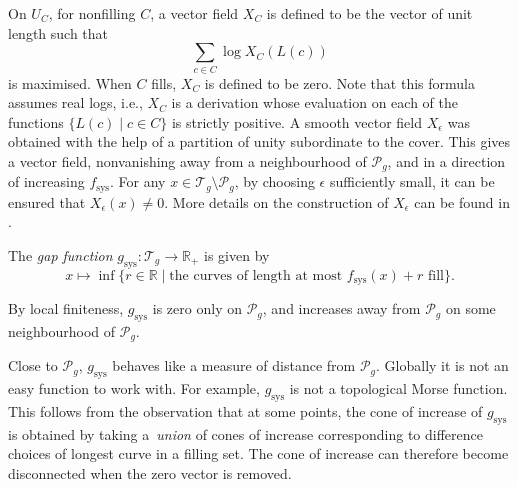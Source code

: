\documentclass[pdftex]{sigma}
\numberwithin{equation}{section}
\begin{document}
On $U_{C}$, for nonfilling $C$, a vector field $X_{C}$ is defined to be the vector of unit length such that
\begin{equation*}
\sum_{c\in C}\log X_{C}(L(c))
\end{equation*}
is maximised. When $C$ fills, $X_{C}$ is defined to be zero. Note that this formula assumes real logs, i.e., $X_{C}$ is a derivation whose evaluation on each of the functions $\{L(c) \mid c\in C\}$ is strictly positive. A smooth vector field $X_{\epsilon}$ was obtained with the help of a partition of unity subordinate to the cover. This gives a vector field, nonvanishing away from a neighbourhood of $\mathcal{P}_{g}$, and in a direction of increasing $f_{\mathrm{sys}}$. For any $x\in \mathcal{T}_{g}\setminus \mathcal{P}_{g}$, by choosing $\epsilon$ sufficiently small, it can be ensured that $X_{\epsilon}(x)\neq 0$. More details on the construction of $X_{\epsilon}$ can be found in \cite{Thurston}.


\begin{Definition}\label{Def8}
The \textit{gap function} $g_{\mathrm{sys}}\colon\mathcal{T}_{g}\rightarrow \mathbb{R}_{+}$ is given by
\begin{equation*}
x\mapsto \inf\{r\in \mathbb{R} \mid \text{the curves of length at most }f_{\mathrm{sys}}(x)+r\text{ fill}\}.
\end{equation*}
\end{Definition}

By local finiteness, $g_{\mathrm{sys}}$ is zero only on $\mathcal{P}_{g}$, and increases away from $\mathcal{P}_{g}$ on some neighbourhood of $\mathcal{P}_{g}$.

\begin{Remark}
Close to $\mathcal{P}_{g}$, $g_{\mathrm{sys}}$ behaves like a measure of distance from $\mathcal{P}_{g}$. Globally it is not an easy function to work with. For example, $g_{\mathrm{sys}}$ is not a topological Morse function. This follows from the observation that at some points, the cone of increase of $g_{\mathrm{sys}}$ is obtained by taking a~\textit{union} of cones of increase corresponding to difference choices of longest curve in a filling set. The cone of increase can therefore become disconnected when the zero vector is removed.
\end{Remark}
\end{document}
